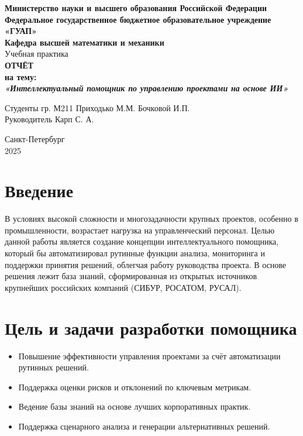 \documentclass[12pt]{article}
\begin{document}
\begin{titlepage}
    \begin{center}
        \textbf{{Министерство науки и высшего образования Российской Федерации}}\\
        \textbf{Федеральное государственное бюджетное образовательное учреждение}\\
        \textbf{«ГУАП»}\\[1mm]
        \textbf{Кафедра высшей математики и механики}\\[10mm]
        \vfill
        {\large Учебная практика}\\[2mm]
        \textbf{\LARGE ОТЧЁТ}\\[2mm]
        \textbf{\large на тему:}\\[2mm]
        \textbf{\Large \textit{«Интеллектуальный помощник по управлению проектами на основе ИИ»}}\\[25mm]

        \begin{flushright}
            Студенты гр. М211 \hfill Приходько М.М. Бочковой И.П.\\
            Руководитель \hfill Карп С. А.\\
        \end{flushright}

        \vfill
        Санкт-Петербург\\
        2025
    \end{center}
\end{titlepage}

\section*{Введение}
В условиях высокой сложности и многозадачности крупных проектов, особенно в промышленности, возрастает нагрузка на управленческий персонал. Целью данной работы является создание концепции интеллектуального помощника, который бы автоматизировал рутинные функции анализа, мониторинга и поддержки принятия решений, облегчая работу руководства проекта. В основе решения лежит база знаний, сформированная из открытых источников крупнейших российских компаний (СИБУР, РОСАТОМ, РУСАЛ).

\section{Цель и задачи разработки помощника}
\begin{itemize}
    \item Повышение эффективности управления проектами за счёт автоматизации рутинных решений.
    \item Поддержка оценки рисков и отклонений по ключевым метрикам.
    \item Ведение базы знаний на основе лучших корпоративных практик.
    \item Поддержка сценарного анализа и генерации альтернативных решений.
\end{itemize}
\end{document}
